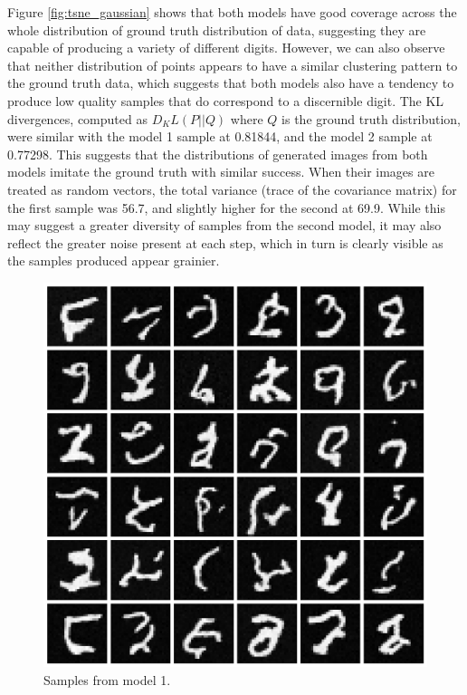 \documentclass[12pt]{article}
\begin{document}
Figure \ref{fig:tsne_gaussian} shows that both models have good coverage across the whole distribution of ground truth distribution of data,
suggesting they are capable of producing a variety of different digits.
However, we can also observe that neither distribution of points appears to have a similar clustering pattern to the ground truth data,
which suggests that both models also have a tendency to produce low quality samples that do correspond to a discernible digit.
The KL divergences, computed as $D_KL(P||Q)$ where $Q$ is the ground truth distribution, were similar with the model 1 sample at 0.81844,
and the model 2 sample at 0.77298.
This suggests that the distributions of generated images from both models imitate the ground truth with similar success.
When their images are treated as random vectors, the total variance (trace of the covariance matrix) for the first sample was 56.7,
and slightly higher for the second at 69.9.
While this may suggest a greater diversity of samples from the second model, it may also reflect the greater noise present at each step,
which in turn is clearly visible as the samples produced appear grainier.

\begin{figure}[hp]
    \includegraphics[scale=0.3]{figures/samples_1.png}
    \caption{Samples from model 1.}
    \label{fig:samples_1}
\end{figure}
\end{document}
